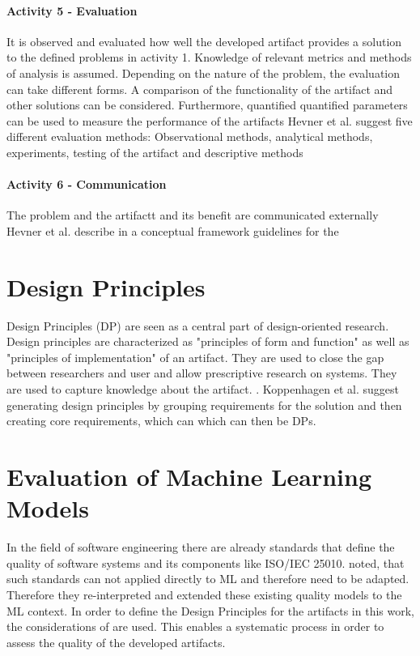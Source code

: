 \paragraph{Activity 5 - Evaluation} 
It is observed and evaluated how well the developed artifact provides a solution to the defined problems in activity 1.
Knowledge of relevant metrics and methods of analysis is assumed. Depending on the nature of the problem, the evaluation can take different forms.
A comparison of the functionality of the artifact and other solutions can be considered. Furthermore, quantified
quantified parameters can be used to measure the performance of the artifacts
\cite[p. 56]{peffers_designscienceresearch_2007}
Hevner et al.  suggest five different evaluation methods: Observational
methods, analytical methods, experiments, testing of the artifact and descriptive
methods 
\cite[p. 87]{hevner_designscienceinformation_2004}

\paragraph{Activity 6 - Communication} 
The problem and the artifactt and its benefit are communicated externally 
\cite[p. 56]{peffers_designscienceresearch_2007}
Hevner et al. describe in a conceptual framework guidelines for the

\section{Design Principles} 
Design Principles (DP) are seen as a central part of design-oriented research.
\cite[p. 348]{gregor_positioningpresentingdesign_2013}
Design principles are characterized as "principles of form and function" as well as "principles of implementation" of an artifact.
\cite[p.8]{gregor_anatomydesigntheory_}
They are used to close the gap between researchers and user and allow prescriptive research on systems. They are used to capture knowledge about the artifact. 
\cite[pp. 37-56]{sein_actiondesignresearch_2011}.
Koppenhagen et al. suggest generating design principles by grouping requirements for the solution and then creating core requirements, which can
which can then be DPs.
\cite[p. 6]{koppenhagen_designscienceresearch_2012}


\section{Evaluation of Machine Learning Models}
In the field of software engineering there are already standards that define the quality of software systems and its components like ISO/IEC 25010. 
\cite[]{siebert_constructionqualitymodel_} noted, that such standards can not applied directly to ML and therefore need to be adapted. Therefore they re-interpreted and extended these existing quality models to the ML context. \cite[p. 1]{siebert_constructionqualitymodel_}
In order to define the Design Principles for the artifacts in this work, the considerations of \cite[]{siebert_constructionqualitymodel_} are used. This enables a systematic process in order to assess the quality of the developed artifacts.




